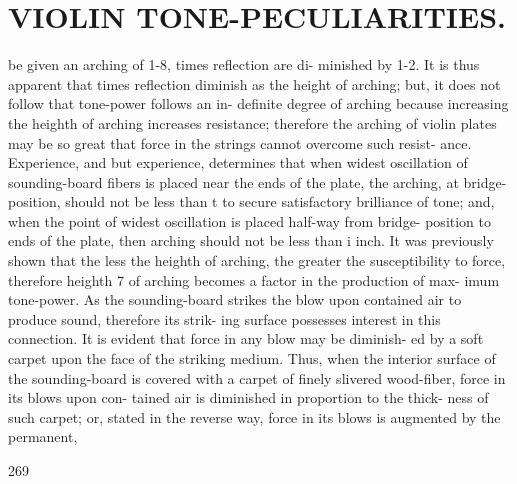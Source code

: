 \documentclass{article}
\begin{document}
\section*{VIOLIN TONE-PECULIARITIES.}
be given an arching of 1-8, times reflection are di- minished by 1-2. It is thus apparent that times reflection diminish as the height of arching; but, it does not follow that tone-power follows an in- definite degree of arching because increasing the heighth of arching increases resistance; therefore the arching of violin plates may be so great that force in the strings cannot overcome such resist- ance. Experience, and but experience, determines that when widest oscillation of sounding-board fibers is placed near the ends of the plate, the arching, at bridge-position, should not be less than t to secure satisfactory brilliance of tone; and, when the point of widest oscillation is placed half-way from bridge- position to ends of the plate, then arching should not be less than i inch. It was previously shown that the less the heighth of arching, the greater the susceptibility to force, therefore heighth 7 of arching becomes a factor in the production of max- imum tone-power. As the sounding-board strikes the blow upon contained air to produce sound, therefore its strik- ing surface possesses interest in this connection. It is evident that force in any blow may be diminish- ed by a soft carpet upon the face of the striking medium. Thus, when the interior surface of the sounding-board is covered with a carpet of finely slivered wood-fiber, force in its blows upon con- tained air is diminished in proportion to the thick- ness of such carpet; or, stated in the reverse way, force in its blows is augmented by the permanent,

269
\end{document}
